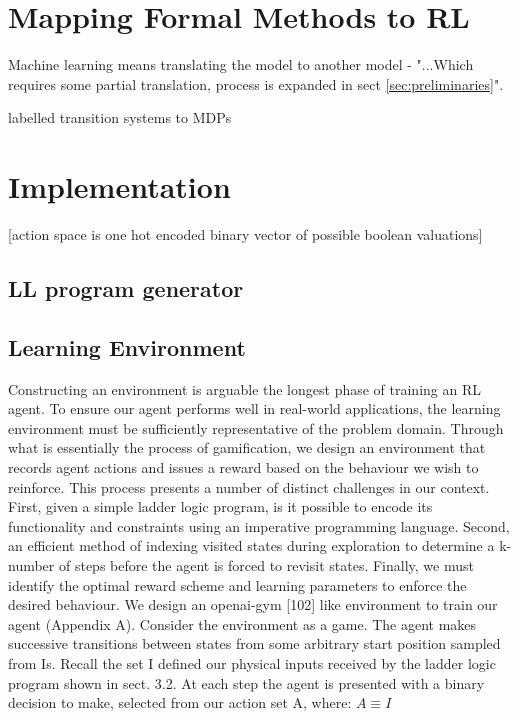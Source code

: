 \documentclass[runningheads]{llncs}
\begin{document}

\section{Mapping Formal Methods to RL}
Machine learning means translating the model to another model - "...Which requires some partial translation, process is expanded in sect \ref{sec:preliminaries}".

labelled transition systems to MDPs

\section{Implementation}
[action space is one hot encoded binary vector of possible boolean valuations]
\subsection{LL program generator}
\subsection{Learning Environment}
Constructing an environment is arguable the longest phase of training an RL agent. To
ensure our agent performs well in real-world applications, the learning environment must
be sufficiently representative of the problem domain. Through what is essentially the
process of gamification, we design an environment that records agent actions and issues a
reward based on the behaviour we wish to reinforce. This process presents a number of
distinct challenges in our context. First, given a simple ladder logic program, is it possible
to encode its functionality and constraints using an imperative programming language.
Second, an efficient method of indexing visited states during exploration to determine a
k-number of steps before the agent is forced to revisit states. Finally, we must identify the
optimal reward scheme and learning parameters to enforce the desired behaviour. We design an openai-gym [102] like environment to train our agent (Appendix A).
Consider the environment as a game. The agent makes successive transitions between
states from some arbitrary start position sampled from Is. Recall the set I  defined our physical inputs received by the ladder logic program shown in sect. 3.2. At each step the
agent is presented with a binary decision to make, selected from our action set A, where: $A \equiv I$
\end{document}
